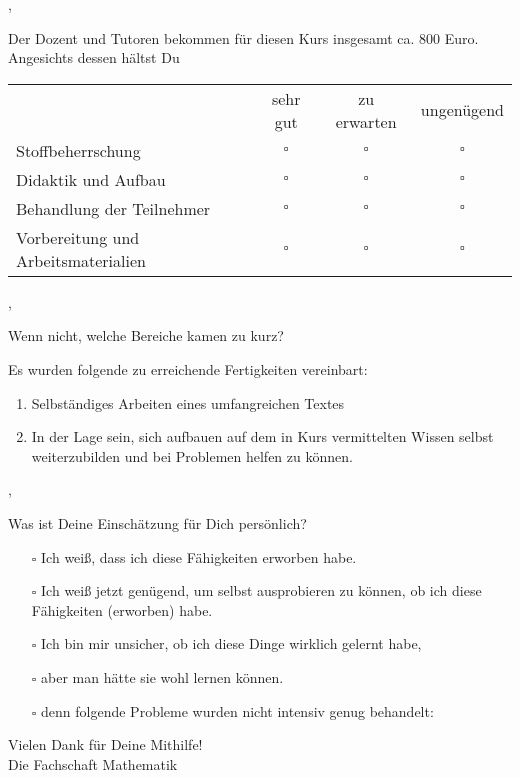 \sep

Der Dozent und Tutoren bekommen für diesen Kurs insgesamt ca. 800 Euro. Angesichts dessen hältst Du

\begin{tabular}{lccc}
	& sehr gut & zu erwarten & ungenügend \\
	Stoffbeherrschung & $\square$ & $\square$ & $\square$ \\
	Didaktik und Aufbau & $\square$ & $\square$ & $\square$ \\
	Behandlung der Teilnehmer & $\square$ & $\square$ & $\square$ \\
	Vorbereitung und Arbeitsmaterialien & $\square$ & $\square$ & $\square$ \\
\end{tabular}

\sep

Wenn nicht, welche Bereiche kamen zu kurz? \hrulefill

\hrulefill

\hrulefill

\hrulefill

\newpage

Es wurden folgende zu erreichende Fertigkeiten vereinbart:

\begin{enumerate}
	\item
		Selbständiges Arbeiten eines umfangreichen Textes

	\item
		In der Lage sein, sich aufbauen auf dem in Kurs vermittelten Wissen
		selbst weiterzubilden und bei Problemen helfen zu können.
\end{enumerate}

\sep

Was ist Deine Einschätzung für Dich persönlich?
\begin{itemize}
	\item[$\square$]
		Ich weiß, dass ich diese Fähigkeiten erworben habe.
	\item[$\square$]
		Ich weiß jetzt genügend, um selbst ausprobieren zu können, ob ich diese
		Fähigkeiten (erworben) habe.
	\item[$\square$]
		Ich bin mir unsicher, ob ich diese Dinge wirklich gelernt habe,
	\item[$\square$]
		aber man hätte sie wohl lernen können.
	\item[$\square$]
		denn folgende Probleme wurden nicht intensiv genug behandelt: \hrulefill

		\hrulefill

		\hrulefill

		\hrulefill
\end{itemize}

\vfill

\begin{flushright}
	Vielen Dank für Deine Mithilfe! \\
	Die Fachschaft Mathematik
\end{flushright}



